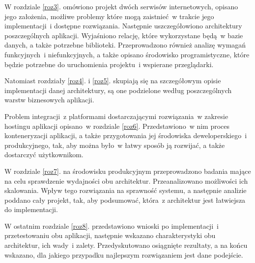 W rozdziale \ref{roz3}. omówiono projekt dwóch serwisów internetowych, opisano jego założenia, możliwe problemy które mogą zaistnieć~w trakcie jego implementacji~i dostępne rozwiązania. Następnie uszczegółowiono architektury poszczególnych aplikacji. Wyjaśniono relację, które wykorzystane będą~w bazie danych, a także potrzebne biblioteki. Przeprowadzono również analizę wymagań funkcyjnych~i niefunkcyjnych, a także opisano środowisko programistyczne, które będzie potrzebne do uruchomienia projektu~i wspierane przeglądarki.

Natomiast rozdziały \ref{roz4}. i \ref{roz5}. skupiają się na szczegółowym opisie implementacji danej architektury, są one podzielone według poszczególnych warstw biznesowych aplikacji.

Problem integracji~z platformami dostarczającymi rozwiązania~w zakresie hostingu aplikacji opisano~w rozdziale \ref{roz6}. Przedstawiono~w nim proces konteneryzacji aplikacji, a także przygotowania jej środowiska deweloperskiego~i produkcyjnego, tak, aby można było~w łatwy sposób ją rozwijać, a także dostarczyć użytkownikom.

W rozdziale \ref{roz7}. na środowisku produkcyjnym przeprowadzono  badania mające na celu sprawdzenie wydajności obu architektur. Przeanalizowano możliwości ich skalowania. Wpływ tego rozwiązania na sprawność systemu, a następnie analizie poddano cały projekt, tak, aby podsumować, która~z architektur jest łatwiejsza do implementacji.

W ostatnim rozdziale \ref{roz8}. przedstawiono wnioski po implementacji~i przetestowaniu obu aplikacji, następnie wskazano charakterystyki obu architektur, ich wady~i zalety. Przedyskutowano osiągnięte rezultaty, a na końcu wskazano, dla jakiego przypadku najlepszym rozwiązaniem jest dane podejście.